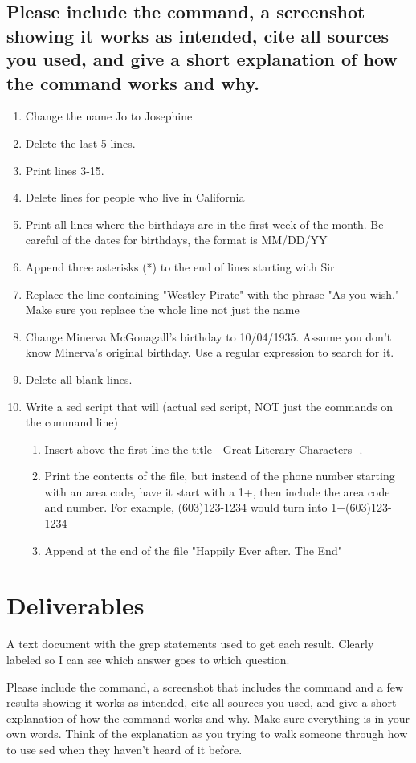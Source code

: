 \documentclass[12pt]{article}
\begin{document}
\subsection*{Please include the command, a screenshot showing it works as intended, cite all sources you used, and give a short explanation of how the command works and why.}
    \begin{enumerate}
        \item Change the name Jo to Josephine
        \item Delete the last 5 lines.
        \item Print lines 3-15.
        \item Delete lines for people who live in California
        \item Print all lines where the birthdays are in the first week of the month.  Be careful of the dates for birthdays, the format is MM/DD/YY
        \item Append three asterisks (*) to the end of lines starting with Sir
        \item Replace the line containing "Westley Pirate" with the phrase "As you wish."  Make sure you replace the whole line not just the name
        \item Change Minerva McGonagall's birthday to 10/04/1935. Assume you don't know Minerva's original birthday. Use a regular expression to search for it.
        \item Delete all blank lines.
        \item Write a sed script that will  (actual sed script, NOT just the commands on the command line)
        \begin{enumerate}
            \item Insert above the first line the title  - Great Literary Characters -.
            \item Print the contents of the file, but instead of the phone number starting with an area code, have it start with a 1+, then include the area code and number.  For example, (603)123-1234 would turn into 1+(603)123-1234
            \item Append at the end of the file "Happily Ever after. The End"
        \end{enumerate}


    \end{enumerate}



\section*{Deliverables}
A text document with the grep statements used to get each result.  Clearly labeled so I can see which answer goes to which question.


Please include the command, a screenshot that includes the command and a few results showing it works as intended, cite all sources you used, and give a short explanation of how the command works and why. Make sure everything is in your own words.  Think of the explanation as you trying to walk someone through how to use sed when they haven't heard of it before.
\end{document}
